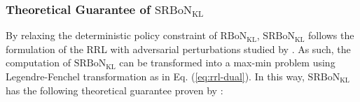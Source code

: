 

\subsubsection{Theoretical Guarantee of $\mathrm{SRBoN}_{\mathrm{KL}}$}\label{sec:kl_sec}

By relaxing the deterministic policy constraint of $\mathrm{RBoN}_{\mathrm{KL}}$, $\mathrm{SRBoN}_{\mathrm{KL}}$ follows the formulation of the RRL with adversarial perturbations studied by \citet{brekelmans2022your}. 
As such, the computation of $\mathrm{SRBoN}_{\mathrm{KL}}$ can be transformed into a max-min problem using Legendre-Fenchel transformation \citep{touchette2005legendre} as in Eq. (\ref{eq:rrl-dual}). 
In this way, $\mathrm{SRBoN}_{\mathrm{KL}}$ has the following theoretical guarantee proven by \citet{brekelmans2022your}:





